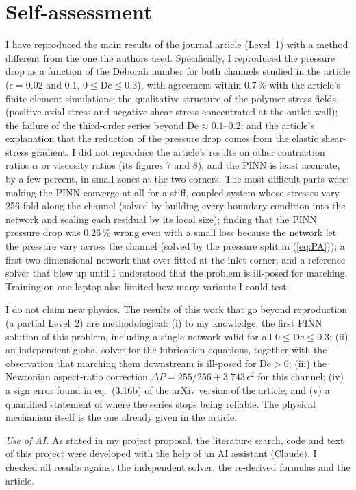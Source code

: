 \documentclass[11pt,a4paper]{article}
\newcommand{\De}{\mathrm{De}}
\begin{document}
\section{Self-assessment}
I have reproduced the main results of the journal article (Level~1) with a method different from the one the authors used. Specifically, I reproduced the pressure drop as a function of the Deborah number for both channels studied in the article ($\epsilon=0.02$ and $0.1$, $0\le\De\le0.3$), with agreement within 0.7\,\% with the article's finite-element simulations; the qualitative structure of the polymer stress fields (positive axial stress and negative shear stress concentrated at the outlet wall); the failure of the third-order series beyond $\De\approx0.1$--$0.2$; and the article's explanation that the reduction of the pressure drop comes from the elastic shear-stress gradient. I did not reproduce the article's results on other contraction ratios $\alpha$ or viscosity ratios (its figures 7 and 8), and the PINN is least accurate, by a few percent, in small zones at the two corners. The most difficult parts were: making the PINN converge at all for a stiff, coupled system whose stresses vary 256-fold along the channel (solved by building every boundary condition into the network and scaling each residual by its local size); finding that the PINN pressure drop was 0.26\,\% wrong even with a small loss because the network let the pressure vary across the channel (solved by the pressure split in (\ref{eq:PA})); a first two-dimensional network that over-fitted at the inlet corner; and a reference solver that blew up until I understood that the problem is ill-posed for marching. Training on one laptop also limited how many variants I could test.

I do not claim new physics. The results of this work that go beyond reproduction (a partial Level~2) are methodological: (i) to my knowledge, the first PINN solution of this problem, including a single network valid for all $0\le\De\le0.3$; (ii) an independent global solver for the lubrication equations, together with the observation that marching them downstream is ill-posed for $\De>0$; (iii) the Newtonian aspect-ratio correction $\Delta P=255/256+3.743\,\epsilon^2$ for this channel; (iv) a sign error found in eq.~(3.16b) of the arXiv version of the article; and (v) a quantified statement of where the series stops being reliable. The physical mechanism itself is the one already given in the article.

\emph{Use of AI.} As stated in my project proposal, the literature search, code and text of this project were developed with the help of an AI assistant (Claude). I checked all results against the independent solver, the re-derived formulas and the article.
\end{document}
